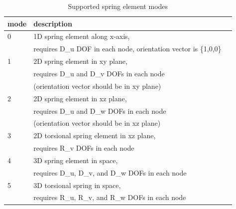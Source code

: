 \documentclass[a4paper]{article}
\begin{document}
\begin{table}
  \centering
  \begin{tabular}{lll}
    \hline
    mode & description\\
    \hline
    0 & 1D spring element along x-axis,\\
    & requires D\_u DOF in each node, orientation vector is \{1,0,0\}\\
    1 & 2D spring element in xy plane,\\
    & requires D\_u and D\_v DOFs in each node \\
    & (orientation vector should be in xy plane)\\
    2 & 2D spring element in xz plane,\\
    & requires D\_u and D\_w DOFs in each node \\
    & (orientation vector should be in xz plane)\\
    3 & 2D torsional spring element in xz plane,\\
    & requires R\_v DOFs in each node\\
    4 & 3D spring element in space,\\
    & requires D\_u, D\_v, and D\_w DOFs in each node\\
    5 & 3D torsional spring in space,\\
    & requires R\_u, R\_v, and R\_w DOFs in each node\\
    \hline
  \end{tabular}
  \caption{Supported spring element modes } \label{spring_mode_table}
\end{table}

\clearpage
\end{document}
